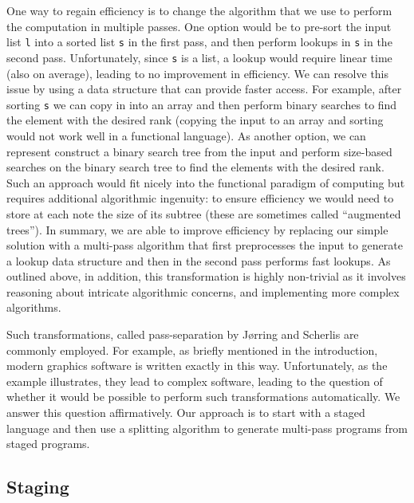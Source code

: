 \begin{abstrsyn}
One way to regain efficiency is to change the algorithm that we use to
perform the computation in multiple passes.  One option would be to
pre-sort the input list \texttt{l} into a sorted list \texttt{s} in
the first pass, and then perform lookups in \texttt{s} in the second
pass.  Unfortunately, since \texttt{s} is a list, a lookup would
require linear time (also on average), leading to no improvement in
efficiency.  We can resolve this issue by using a data structure that
can provide faster access.  For example, after sorting \texttt{s} we
can copy in into an array and then perform binary searches to find the
element with the desired rank (copying the input to an array and
sorting would not work well in a functional language).  As another
option, we can represent construct a binary search tree from the input
and perform size-based searches on the binary search tree to find the
elements with the desired rank.  Such an approach would fit nicely
into the functional paradigm of computing but requires additional
algorithmic ingenuity: to ensure efficiency we would need to store at
each note the size of its subtree (these are sometimes called
``augmented trees'').  In summary, we are able to improve efficiency
by replacing our simple solution with a multi-pass algorithm that
first preprocesses the input to generate a lookup data structure and
then in the second pass performs fast lookups.  As outlined above, in
addition, this transformation is highly non-trivial as it involves
reasoning about intricate algorithmic concerns, and implementing more
complex algorithms.

Such transformations, called pass-separation by J{\o}rring and
Scherlis are commonly employed.  For example, as briefly mentioned in
the introduction, modern graphics software is written exactly in this
way.  Unfortunately, as the example illustrates, they lead to complex
software, leading to the question of whether it would be possible to
perform such transformations automatically.  We answer this question
affirmatively.  Our approach is to start with a staged language and
then use a splitting algorithm to generate multi-pass programs from
staged programs.


\subsection{Staging}


\end{abstrsyn}
